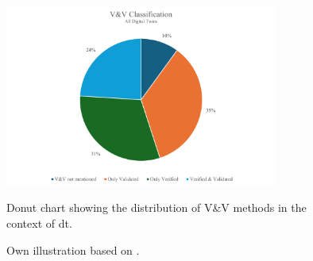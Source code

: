 \begin{figure}[htbp]
  \centering
  \includegraphics[width=0.8\textwidth]{figures/vvbitencourt.png}
  \caption[Donut Chart V\&V]{Donut chart showing the distribution of V\&V methods in the context of \gls{dt}.}
  \label{fig:vvbitencourt}
  \caption*{Own illustration based on \textcite{Bitencourt2023}.}
\end{figure}

